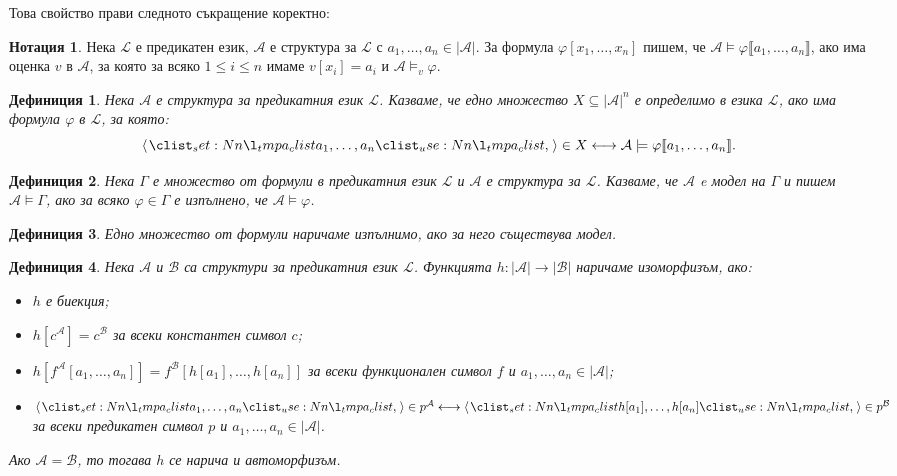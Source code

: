 \documentclass[12pt]{article}
\newcommand{\calA}{\mathcal{A}}
\newcommand{\calL}{\mathcal{L}}
\newcommand{\calB}{\mathcal{B}}
\newcommand{\db}[1]{\llbracket #1 \rrbracket}
\newtheorem*{definition}{Дефиниция}
\theoremstyle{definition}
\newtheorem*{notation}{Нотация}
\begin{document}
Това свойство прави следното съкращение коректно:
\begin{notation}
  Нека $\calL$ е предикатен език, $\calA$ е структура за $\calL$ с $a_1, \dots, a_n \in |\calA|$.
  За формула $\varphi[x_1, \dots, x_n]$ пишем, че $\calA \models \varphi \db{a_1, \dots, a_n}$, ако има оценка $v$ в $\calA$, за която за всяко $1 \leq i \leq n$ имаме $v[x_i] = a_i$ и $\calA \models_v \varphi$.
\end{notation}

\begin{definition}
    Нека $\calA$ е структура за предикатния език $\calL$.
    Казваме, че едно множество $X \subseteq |\calA|^n$ е определимо в езика $\calL$, ако има формула $\varphi$ в $\calL$, за която:
    \[
    \opair{a_1, \dots, a_n} \in X \longleftrightarrow \calA \models \varphi \db{a_1, \dots, a_n}.
    \]
\end{definition}

\begin{definition}
    Нека $\Gamma$ е множество от формули в предикатния език $\calL$ и $\calA$ е структура за $\calL$.
    Казваме, че $\calA$ e модел на $\Gamma$ и пишем $\calA \models \Gamma$, ако за всяко $\varphi \in \Gamma$ е изпълнено, че $\calA \models \varphi$.
\end{definition}

\begin{definition}
    Едно множество от формули наричаме изпълнимо, ако за него съществува модел.
\end{definition}

\begin{definition}
    Нека $\calA$ и $\calB$ са структури за предикатния език $\calL$.
    Функцията $h : |\calA| \rightarrow |\calB|$ наричаме изоморфизъм, ако:
    \begin{itemize}
        \item $h$ е биекция;
        \item $h[c^\calA] = c^\calB$ за всеки константен символ $c$;
        \item $h[f^\calA[a_1, \dots, a_n]] = f^\calB[h[a_1], \dots, h[a_n]]$ за всеки функционален символ $f$ и $a_1, \dots, a_n \in |\calA|$;
        \item $\opair{a_1, \dots, a_n} \in p^\calA \longleftrightarrow \opair{h[a_1], \dots, h[a_n]} \in p^\calB$ за всеки предикатен символ $p$ и $a_1, \dots, a_n \in |\calA|$.
    \end{itemize}
    Ако $\calA = \calB$, то тогава $h$ се нарича и автоморфизъм.
\end{definition}
\end{document}
